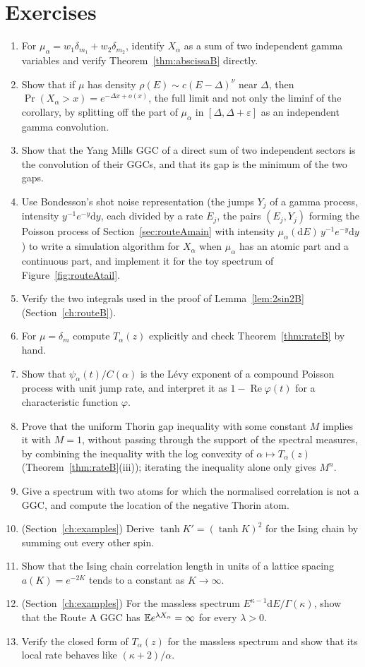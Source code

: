 \section*{Exercises}
\begin{enumerate}
\item For $\mu_\alpha=w_1\delta_{m_1}+w_2\delta_{m_2}$, identify $X_\alpha$ as a sum of two independent gamma variables and verify Theorem~\ref{thm:abscissaB} directly.
\item Show that if $\mu$ has density $\rho(E)\sim c(E-\Delta)^\nu$ near $\Delta$, then $\Pr(X_\alpha>x)=e^{-\Delta x+o(x)}$, the full limit and not only the liminf of the corollary, by splitting off the part of $\mu_\alpha$ in $[\Delta,\Delta+\varepsilon]$ as an independent gamma convolution.
\item Show that the Yang Mills GGC of a direct sum of two independent sectors is the convolution of their GGCs, and that its gap is the minimum of the two gaps.
\item Use Bondesson's shot noise representation (the jumps $Y_j$ of a gamma process, intensity $y^{-1}e^{-y}\mathrm dy$, each divided by a rate $E_j$, the pairs $(E_j,Y_j)$ forming the Poisson process of Section~\ref{sec:routeAmain} with intensity $\mu_\alpha(\mathrm dE)\,y^{-1}e^{-y}\mathrm dy$) to write a simulation algorithm for $X_\alpha$ when $\mu_\alpha$ has an atomic part and a continuous part, and implement it for the toy spectrum of Figure~\ref{fig:routeAtail}.
\item Verify the two integrals used in the proof of Lemma~\ref{lem:2sin2B} (Section~\ref{ch:routeB}).
\item For $\mu=\delta_m$ compute $T_\alpha(z)$ explicitly and check Theorem~\ref{thm:rateB} by hand.
\item Show that $\psi_\alpha(t)/C(\alpha)$ is the L\'evy exponent of a compound Poisson process with unit jump rate, and interpret it as $1-\operatorname{Re}\varphi(t)$ for a characteristic function $\varphi$.
\item Prove that the uniform Thorin gap inequality with some constant $M$ implies it with $M=1$, without passing through the support of the spectral measures, by combining the inequality with the log convexity of $\alpha\mapsto T_\alpha(z)$ (Theorem~\ref{thm:rateB}(iii)); iterating the inequality alone only gives $M^n$.
\item Give a spectrum with two atoms for which the normalised correlation is not a GGC, and compute the location of the negative Thorin atom.
\item (Section~\ref{ch:examples}) Derive $\tanh K'=(\tanh K)^2$ for the Ising chain by summing out every other spin.
\item Show that the Ising chain correlation length in units of a lattice spacing $a(K)=e^{-2K}$ tends to a constant as $K\to\infty$.
\item (Section~\ref{ch:examples}) For the massless spectrum $E^{\kappa-1}\mathrm dE/\Gamma(\kappa)$, show that the Route A GGC has $\mathbb{E} e^{\lambda X_\alpha}=\infty$ for every $\lambda>0$.
\item Verify the closed form of $T_\alpha(z)$ for the massless spectrum and show that its local rate behaves like $(\kappa+2)/\alpha$.
\end{enumerate}
